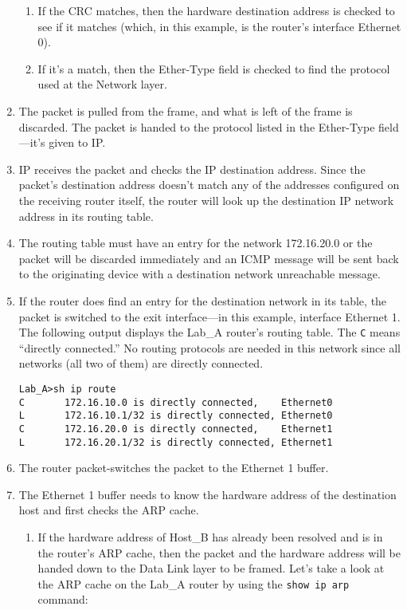 \begin{enumerate}
  \begin{enumerate}
  \tightlist
  \item
    If the CRC matches, then the hardware destination address is checked
    to see if it matches (which, in this example, is the router's
    interface Ethernet 0).
  \item
    If it's a match, then the Ether-Type field is checked to find the
    protocol used at the Network layer.
  \end{enumerate}
\item
  The packet is pulled from the frame, and what is left of the frame is
  discarded. The packet is handed to the protocol listed in the
  Ether-Type field---it's given to IP.
\item
  IP receives the packet and checks the IP destination address. Since
  the packet's destination address doesn't match any of the addresses
  configured on the receiving router itself, the router will look up the
  destination IP network address in its routing table.
\item
  The routing table must have an entry for the network 172.16.20.0 or
  the packet will be discarded immediately and an ICMP message will be
  sent back to the originating device with a destination network
  unreachable message.
\item
  If the router does find an entry for the destination network in its
  table, the packet is switched to the exit interface---in this example,
  interface Ethernet 1. The following output displays the Lab\_A
  router's routing table. The \texttt{C} means ``directly connected.''
  No routing protocols are needed in this network since all networks
  (all two of them) are directly connected.

\begin{verbatim}
Lab_A>sh ip route
C       172.16.10.0 is directly connected,    Ethernet0
L       172.16.10.1/32 is directly connected, Ethernet0
C       172.16.20.0 is directly connected,    Ethernet1
L       172.16.20.1/32 is directly connected, Ethernet1
\end{verbatim}
\item
  \protect\hypertarget{c09.xhtmlux5cux23Page_364}{}{}The router
  packet-switches the packet to the Ethernet 1 buffer.
\item
  The Ethernet 1 buffer needs to know the hardware address of the
  destination host and first checks the ARP cache.

  \begin{enumerate}
  \item
    If the hardware address of Host\_B has already been resolved and is
    in the router's ARP cache, then the packet and the hardware address
    will be handed down to the Data Link layer to be framed. Let's take
    a look at the ARP cache on the Lab\_A router by using the
    \texttt{show\ ip\ arp} command:


\end{enumerate}
\end{enumerate}
